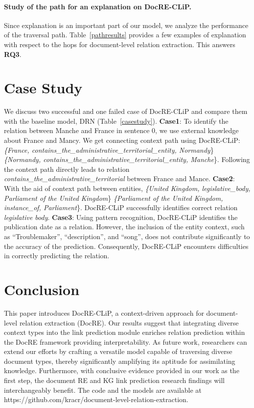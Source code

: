 \documentclass[letterpaper]{article} %
\begin{document}
\paragraph{\textbf{Study of the path for an explanation on DocRE-CLiP.}} Since explanation is an important part of our model, we analyze the performance of the traversal path. Table~\ref{pathresults} provides a few examples of explanation with respect to the hops for document-level relation extraction. This answers \textbf{RQ3}.

\section{Case Study}
We discuss two successful and one failed case of DocRE-CLiP and compare them with the baseline model, DRN (Table~\ref{casestudy}).
\textbf{Case1}: To identify the relation between Manche and France in sentence 0, we use external knowledge about France and Mancy.
We get connecting context path using DocRE-CLiP:
\textit{\{France, contains\_the\_administrative\_territorial\_entity, Normandy}\}
\textit{\{Normandy, contains\_the\_administrative\_territorial\_entity, Manche}\}.
Following the context path directly leads to relation \textit{contains\_the\_administrative\_territorial} between France and Mance. \textbf{Case2}:
With the aid of context path between entities,
\textit{\{United Kingdom, legislative\_body,	Parliament of the United Kingdom}\}
\textit{\{Parliament of the United Kingdom,	instance\_of,	Parliament}\}.
DocRE-CLiP successfully identifies correct relation \textit{legislative body}. \textbf{Case3}: Using pattern recognition, DocRE-CLiP identifies the publication date as a relation. However, the inclusion of the entity context, such as \enquote{Troublemaker}, \enquote{description}, and \enquote{song}, does not contribute significantly to the accuracy of the prediction. Consequently, DocRE-CLiP encounters difficulties in correctly predicting the relation.



\section{Conclusion}
This paper introduces DocRE-CLiP, a context-driven approach for document-level relation extraction (DocRE). Our results suggest that integrating diverse context types into the link prediction module enriches relation prediction within the DocRE framework providing interpretability. As future work, researchers can extend our efforts by crafting a versatile model capable of traversing diverse document types, thereby significantly amplifying its aptitude for assimilating knowledge. Furthermore, with conclusive evidence provided in our work as the first step, the document RE and KG link prediction research findings will interchangeably benefit. The code and the models are available at https://github.com/kracr/document-level-relation-extraction.
\end{document}
